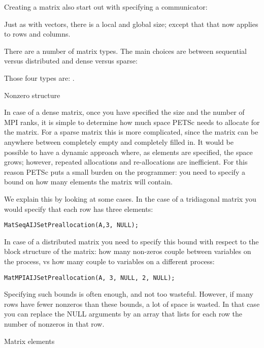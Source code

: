 Creating a matrix also start out with specifying a communicator:
%

Just as with vectors, there is a local and global size; except that
that now applies to rows and columns.
%
%

There are a number of matrix types. The main choices are between
sequential versus distributed and dense versus sparse:
%

Those four types are:    .

 {Nonzero structure}

In case of a dense matrix, once you have specified the size and the
number of MPI ranks, it is simple to determine how much space PETSc
needs to allocate for the matrix. For a sparse matrix this is more
complicated, since the matrix can be anywhere between completely empty
and completely filled in. It would be possible to have a dynamic
approach where, as elements are specified, the space grows; however,
repeated allocations and re-allocations are inefficient. For this
reason PETSc puts a small burden on the programmer: you need to
specify a bound on how many elements the matrix will contain.

We explain this by  looking at some cases. In the case of a
tridiagonal matrix you would specify that each row has three elements:

\begin{verbatim}
MatSeqAIJSetPreallocation(A,3, NULL);
\end{verbatim}

In case of a distributed matrix you need to specify this bound with
respect to the block structure of the matrix: how many non-zeros
couple between variables on the process, vs how many couple to
variables on a different process:

\begin{verbatim}
MatMPIAIJSetPreallocation(A, 3, NULL, 2, NULL);
\end{verbatim}

Specifying such bounds is often enough, and not too wasteful. However,
if many rows have fewer nonzeros than these bounds, a lot of space is
wasted. In that case you can replace the NULL arguments by an array
that lists for each row the number of nonzeros in that row.


 {Matrix elements}

